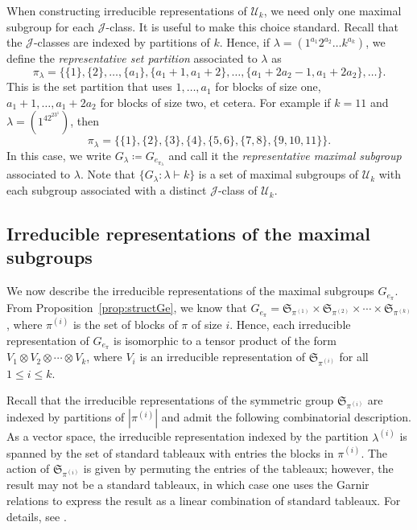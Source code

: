\documentclass[10pt]{amsart}
\theoremstyle{definition}
\theoremstyle{remark}
\newcommand{\defncolor}{\color{darkred}}
\newcommand{\defn}[1]{{\defncolor\emph{#1}}} %
\begin{document}
When constructing irreducible representations of $\mathcal{U}_k$, we need only one maximal subgroup for each $\mathscr{J}$-class.
It is useful to make this choice standard.
Recall that the $\mathscr{J}$-classes are indexed by partitions of $k$. Hence, if $\lambda = (1^{a_1}2^{a_2}\ldots k^{a_k})$, we define the
\defn{representative set partition} associated to $\lambda$ as
\begin{equation}
\label{equation.canonical}
    \pi_\lambda = \{\{1\}, \{2\}, \ldots, \{a_1\}, \{a_1+1, a_1+2\}, \ldots, \{a_1+2a_2-1, a_1+2a_2\}, \ldots \}.
\end{equation}
This is the set partition that uses $1, \ldots, a_1$ for blocks of size one, $a_1+1, \ldots, a_1+2a_2$ for blocks of size two, et cetera.
For example if $k=11$ and $\lambda = (1^42^23^1)$, then
\[
    \pi_\lambda = \{\{1\}, \{2\}, \{3\}, \{4\},\{5,6\},\{7,8\},\{9,10,11\}\}.
\]
In this case, we write $G_\lambda \coloneqq G_{e_{\pi_\lambda}}$ and call it the
\defn{representative maximal subgroup} associated to $\lambda$.
Note that $\{G_\lambda : \lambda \vdash k\}$ is a set of maximal subgroups of
$\mathcal{U}_k$ with each subgroup associated with a distinct
$\mathscr{J}$-class of $\mathcal{U}_k$.

\subsection{Irreducible representations of the maximal subgroups}
\label{sec:irrepsGe}
We now describe the irreducible representations of the maximal subgroups $G_{e_\pi}$.
From Proposition~\ref{prop:structGe}, we know that
$G_{e_\pi} = \mathfrak{S}_{\pi^{(1)}} \times \mathfrak{S}_{\pi^{(2)}}
\times \cdots \times \mathfrak{S}_{\pi^{(k)}}$,
where $\pi^{(i)}$ is the set of blocks of $\pi$ of size $i$.
Hence, each irreducible representation of $G_{e_\pi}$
is isomorphic to a tensor product of the form
$V_1 \otimes V_2 \otimes \cdots \otimes V_k$,
where $V_i$ is an irreducible representation of $\mathfrak{S}_{\pi^{(i)}}$
for all $1 \leqslant i \leqslant k$.

Recall that the irreducible representations of the symmetric group
$\mathfrak{S}_{\pi^{(i)}}$ are indexed by partitions of $|\pi^{(i)}|$
and admit the following combinatorial description.
As a vector space, the irreducible representation indexed by the partition
$\lambda^{(i)}$ is spanned by the set of standard tableaux with entries the
blocks in $\pi^{(i)}$. The action of $\mathfrak{S}_{\pi^{(i)}}$ is given by
permuting the entries of the tableaux; however, the result may not be
a standard tableaux, in which case one uses the Garnir relations to express the
result as a linear combination of standard tableaux. For details, see
\cite[Chapter~2]{Sagan.2001}.
\end{document}

